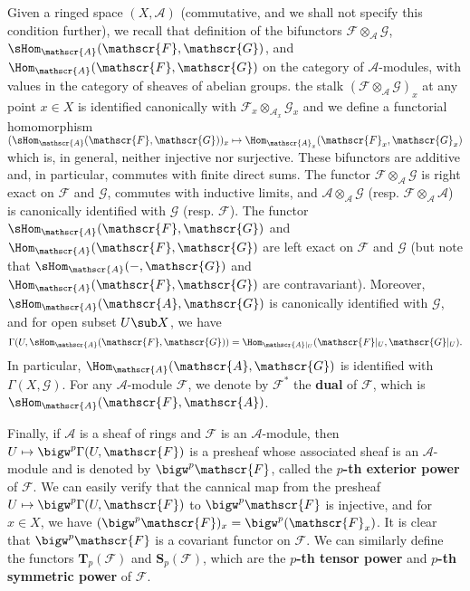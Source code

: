 Given a ringed space $(X,\mathscr{A})$ (commutative, and we shall not specify this condition further), we recall that definition of the bifunctors $\mathscr{F}\otimes_{\mathscr{A}}\mathscr{G}$, $\sHom_{\mathscr{A}}(\mathscr{F},\mathscr{G})$, and $\Hom_{\mathscr{A}}(\mathscr{F},\mathscr{G})$ on the category of $\mathscr{A}$-modules, with values in the category of sheaves of abelian groups. the stalk $(\mathscr{F}\otimes_{\mathscr{A}}\mathscr{G})_x$ at any point $x\in X$ is identified canonically with $\mathscr{F}_x\otimes_{\mathscr{A}_x}\mathscr{G}_x$ and we define a functorial homomorphism $(\sHom_{\mathscr{A}}(\mathscr{F},\mathscr{G}))_x\mapsto\Hom_{\mathscr{A}_x}(\mathscr{F}_x,\mathscr{G}_x)$ which is, in general, neither injective nor surjective. These bifunctors are additive and, in particular, commutes with finite direct sums. The functor $\mathscr{F}\otimes_{\mathscr{A}}\mathscr{G}$ is right exact on $\mathscr{F}$ and $\mathscr{G}$, commutes with inductive limits, and $\mathscr{A}\otimes_{\mathscr{A}}\mathscr{G}$ (resp. $\mathscr{F}\otimes_{\mathscr{A}}\mathscr{A}$) is canonically identified with $\mathscr{G}$ (resp. $\mathscr{F}$). The functor $\sHom_{\mathscr{A}}(\mathscr{F},\mathscr{G})$ and $\Hom_{\mathscr{A}}(\mathscr{F},\mathscr{G})$ are left exact on $\mathscr{F}$ and $\mathscr{G}$ (but note that $\sHom_{\mathscr{A}}(-,\mathscr{G})$ and $\Hom_{\mathscr{A}}(\mathscr{F},\mathscr{G})$ are contravariant). Moreover, $\sHom_{\mathscr{A}}(\mathscr{A},\mathscr{G})$ is canonically identified with $\mathscr{G}$, and for open subset $U\sub X$, we have
\[\Gamma(U,\sHom_{\mathscr{A}}(\mathscr{F},\mathscr{G}))=\Hom_{\mathscr{A}|_U}(\mathscr{F}|_U,\mathscr{G}|_U).\]
In particular, $\Hom_{\mathscr{A}}(\mathscr{A},\mathscr{G})$ is identified with $\Gamma(X,\mathscr{G})$. For any $\mathscr{A}$-module $\mathscr{F}$, we denote by $\mathscr{F}^*$ the \textbf{dual} of $\mathscr{F}$, which is $\sHom_{\mathscr{A}}(\mathscr{F},\mathscr{A})$.\par
Finally, if $\mathscr{A}$ is a sheaf of rings and $\mathscr{F}$ is an $\mathscr{A}$-module, then $U\mapsto\bigw^p\Gamma(U,\mathscr{F})$ is a presheaf whose associated sheaf is an $\mathscr{A}$-module and is denoted by $\bigw^p\mathscr{F}$, called the \textbf{$p$-th exterior power} of $\mathscr{F}$. We can easily verify that the cannical map from the presheaf $U\mapsto\bigw^p\Gamma(U,\mathscr{F})$ to $\bigw^p\mathscr{F}$ is injective, and for $x\in X$, we have $(\bigw^p\mathscr{F})_x=\bigw^p(\mathscr{F}_x)$. It is clear that $\bigw^p\mathscr{F}$ is a covariant functor on $\mathscr{F}$. We can similarly define the functors $\bm{T}_p(\mathscr{F})$ and $\bm{S}_p(\mathscr{F})$, which are the \textbf{$p$-th tensor power} and \textbf{$p$-th symmetric power} of $\mathscr{F}$.\par
